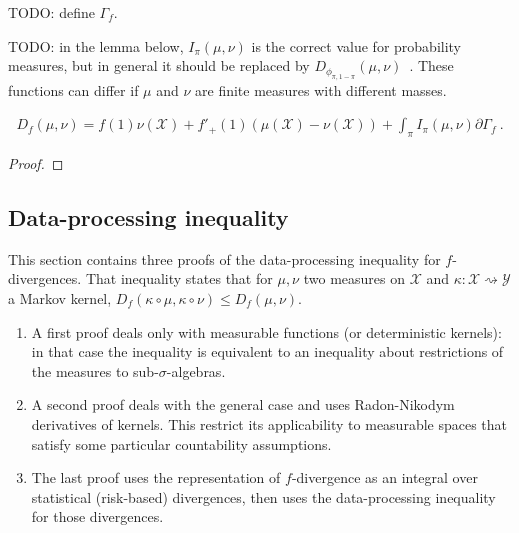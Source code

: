 TODO: define $\Gamma_f$.

TODO: in the lemma below, $I_\pi(\mu, \nu)$ is the correct value for probability measures, but in general it should be replaced by $D_{\phi_{\pi, 1 - \pi}}(\mu, \nu)$~.
These functions can differ if $\mu$ and $\nu$ are finite measures with different masses.

\begin{theorem}
  \label{thm:fDiv_eq_integral}
  \begin{align*}
  D_f(\mu, \nu) = f(1) \nu(\mathcal X) + f'_+(1)(\mu(\mathcal X) - \nu(\mathcal X)) + \int_\pi I_\pi(\mu, \nu) \partial\Gamma_f \: .
  \end{align*}
  
\end{theorem}

\begin{proof}%
{}

\end{proof}




\subsection{Data-processing inequality}

This section contains three proofs of the data-processing inequality for $f$-divergences.
That inequality states that for $\mu, \nu$ two measures on $\mathcal X$ and $\kappa : \mathcal X \rightsquigarrow \mathcal Y$ a Markov kernel, $D_f(\kappa \circ \mu, \kappa \circ \nu) \le D_f(\mu, \nu)$.
\begin{enumerate}
  \item A first proof deals only with measurable functions (or deterministic kernels): in that case the inequality is equivalent to an inequality about restrictions of the measures to sub-$\sigma$-algebras.
  \item A second proof deals with the general case and uses Radon-Nikodym derivatives of kernels. This restrict its applicability to measurable spaces that satisfy some particular countability assumptions.
  \item The last proof uses the representation of $f$-divergence as an integral over statistical (risk-based) divergences, then uses the data-processing inequality for those divergences.
\end{enumerate}




